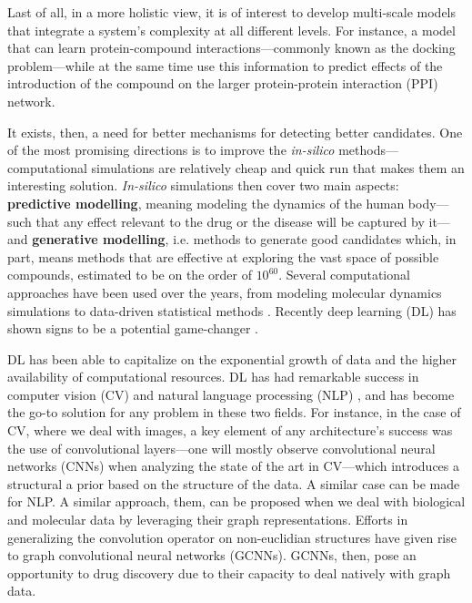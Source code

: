 \documentclass{article}
\begin{document}
Last of all, in a more holistic view, it is of interest to develop multi-scale models
that integrate a system's complexity at all different levels. For instance, a model that
can learn protein-compound interactions---commonly known as the docking problem---while
at the same time use this information to predict effects of the introduction of the
compound on the larger protein-protein interaction (PPI) network\cite{Sun2019}.

It exists, then, a need for better mechanisms for detecting better candidates. One of
 the most promising directions is to improve the \emph{in-silico}
 methods---computational simulations are relatively cheap and quick run that makes them
 an interesting solution. \emph{In-silico} simulations then cover two main aspects:
 \textbf{predictive modelling}, meaning modeling the dynamics of the human body---such
 that any effect relevant to the drug or the disease will be captured by it---and
 \textbf{generative modelling}, i.e. methods to generate good candidates which, in part,
 means methods that are effective at exploring the vast space of possible compounds,
 estimated to be on the order of $10^{60}$\cite{Reymond2012}. Several computational
 approaches have been used over the years, from modeling molecular dynamics simulations
 to data-driven statistical methods \cite{Hung2014, Kuhn2016}. Recently deep learning
 (DL) has shown signs to be a potential game-changer \cite{Dargan2019}. 



 
DL has been able to capitalize on the exponential growth of data and the higher
 availability of computational resources. DL has had remarkable success in computer
 vision (CV) \cite{Guo2016} and natural language processing (NLP) \cite{Young2018}, and
 has become the go-to solution for any problem in these two fields. For instance, in the
 case of CV, where we deal with images, a key element of any architecture's success was
 the use of convolutional layers---one will mostly observe convolutional neural networks
 (CNNs) when analyzing the state of the art in CV---which introduces a structural a
 prior based on the structure of the data\cite{Fukushima1980, LeCun1989, Ulyanov}. A
 similar case can be made for NLP. A similar approach, them, can be proposed when we
 deal with biological and molecular data by leveraging their graph representations.
 Efforts in generalizing the convolution operator on non-euclidian structures have given
 rise to graph convolutional neural networks (GCNNs)\cite{Wu2019}. GCNNs, then, pose an
 opportunity to drug discovery due to their capacity to deal natively with graph
 data\cite{Sun2019}.
 
\end{document}

